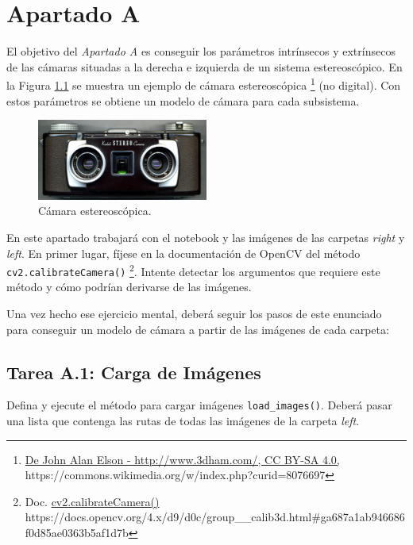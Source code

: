 \chapter{Apartado A}
\label{chapter:tarea_a}

El objetivo del \textit{Apartado A} es conseguir los parámetros intrínsecos y extrínsecos de las cámaras situadas a la derecha e izquierda de un sistema estereoscópico. En la Figura \ref{fig:stereo_camera} se muestra un ejemplo de cámara estereoscópica \footnote{ \href{https://commons.wikimedia.org/w/index.php?curid=8076697}{De John Alan Elson - http://www.3dham.com/, CC BY-SA 4.0, } https://commons.wikimedia.org/w/index.php?curid=8076697} (no digital). Con estos parámetros se obtiene un modelo de cámara para cada subsistema.

\begin{figure}[h]
    \centering
    \includegraphics[width=0.5\textwidth]{Lab_1/template/figures/stereo_camera.jpg}
    \caption{Cámara estereoscópica.}
    \label{fig:stereo_camera}
\end{figure}

En este apartado trabajará con el notebook y las imágenes de las carpetas \textit{right} y \textit{left}. En primer lugar, fíjese en la documentación de OpenCV del método \texttt{cv2.calibrateCamera()} \footnote{Doc. \href{https://docs.opencv.org/4.x/d9/d0c/group\_\_calib3d.html\#ga687a1ab946686f0d85ae0363b5af1d7b}{cv2.calibrateCamera()} https://docs.opencv.org/4.x/d9/d0c/group\_\_calib3d.html\#ga687a1ab946686f0d85ae0363b5af1d7b}. Intente detectar los argumentos que requiere este método y cómo podrían derivarse de las imágenes. 

Una vez hecho ese ejercicio mental, deberá seguir los pasos de este enunciado para conseguir un modelo de cámara a partir de las imágenes de cada carpeta:



\section*{Tarea A.1: Carga de Imágenes}
Defina y ejecute el método para cargar imágenes \texttt{load\_images()}. Deberá pasar una lista que contenga las rutas de todas las imágenes de la carpeta \textit{left}.

